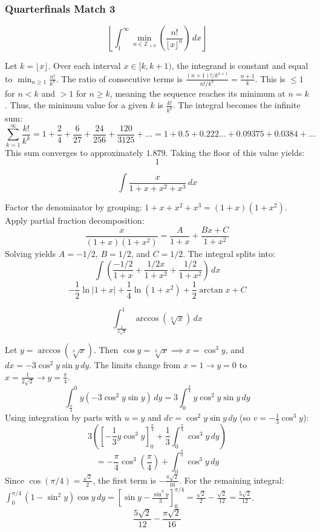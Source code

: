 \subsubsection*{Quarterfinals Match 3}
\begin{questions}
    \question
    \[ \left\lfloor \int_{1}^{\infty} \min_{n \in \mathbb{Z}_{>0}} \left( \frac{n!}{\lfloor x \rfloor^n} \right) \, dx \right\rfloor \]
    \begin{solution}
        Let $k = \lfloor x \rfloor$. Over each interval $x \in [k, k+1)$, the integrand is constant and equal to $\min_{n \ge 1} \frac{n!}{k^n}$.
        The ratio of consecutive terms is $\frac{(n+1)!/k^{n+1}}{n!/k^n} = \frac{n+1}{k}$. This is $\le 1$ for $n < k$ and $> 1$ for $n \ge k$, meaning the sequence reaches its minimum at $n = k$.
        Thus, the minimum value for a given $k$ is $\frac{k!}{k^k}$. The integral becomes the infinite sum:
        \[ \sum_{k=1}^{\infty} \frac{k!}{k^k} = 1 + \frac{2}{4} + \frac{6}{27} + \frac{24}{256} + \frac{120}{3125} + \dots = 1 + 0.5 + 0.222\dots + 0.09375 + 0.0384 + \dots \]
        This sum converges to approximately $1.879$. Taking the floor of this value yields:
        \[ 1 \]
    \end{solution}

    \question
    \[ \int \frac{x}{1 + x + x^2 + x^3} \, dx \]
    \begin{solution}
        Factor the denominator by grouping: $1 + x + x^2 + x^3 = (1+x)(1+x^2)$. Apply partial fraction decomposition:
        \[ \frac{x}{(1+x)(1+x^2)} = \frac{A}{1+x} + \frac{Bx+C}{1+x^2} \]
        Solving yields $A = -1/2$, $B = 1/2$, and $C = 1/2$. The integral splits into:
        \[ \int \left( \frac{-1/2}{1+x} + \frac{1/2 x}{1+x^2} + \frac{1/2}{1+x^2} \right) \, dx \]
        \[ -\frac{1}{2}\ln|1+x| + \frac{1}{4}\ln(1+x^2) + \frac{1}{2}\arctan x + C \]
    \end{solution}

    \question
    \[ \int_{\frac{1}{2\sqrt{2}}}^{1} \arccos(\sqrt[3]{x}) \, dx \]
    \begin{solution}
        Let $y = \arccos(\sqrt[3]{x})$. Then $\cos y = \sqrt[3]{x} \implies x = \cos^3 y$, and $dx = -3\cos^2 y \sin y \, dy$.
        The limits change from $x = 1 \to y = 0$ to $x = \frac{1}{2\sqrt{2}} \to y = \frac{\pi}{4}$. 
        \[ \int_{\frac{\pi}{4}}^{0} y (-3\cos^2 y \sin y) \, dy = 3 \int_{0}^{\frac{\pi}{4}} y \cos^2 y \sin y \, dy \]
        Using integration by parts with $u = y$ and $dv = \cos^2 y \sin y \, dy$ (so $v = -\frac{1}{3}\cos^3 y$):
        \[ 3 \left( \left[ -\frac{1}{3}y \cos^3 y \right]_{0}^{\frac{\pi}{4}} + \frac{1}{3} \int_{0}^{\frac{\pi}{4}} \cos^3 y \, dy \right) \]
        \[ = -\frac{\pi}{4} \cos^3\left(\frac{\pi}{4}\right) + \int_{0}^{\frac{\pi}{4}} \cos^3 y \, dy \]
        Since $\cos(\pi/4) = \frac{\sqrt{2}}{2}$, the first term is $-\frac{\pi\sqrt{2}}{16}$. 
        For the remaining integral: $\int_{0}^{\pi/4} (1-\sin^2 y)\cos y \, dy = \left[ \sin y - \frac{\sin^3 y}{3} \right]_{0}^{\pi/4} = \frac{\sqrt{2}}{2} - \frac{\sqrt{2}}{12} = \frac{5\sqrt{2}}{12}$.
        \[ \frac{5\sqrt{2}}{12} - \frac{\pi\sqrt{2}}{16} \]
    \end{solution}
\end{questions}

